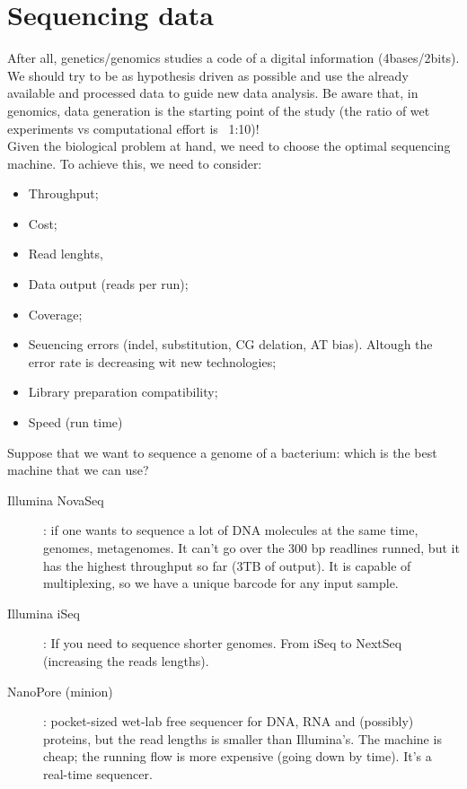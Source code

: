 \graphicspath{{chapters/images/04/}}
\chapter{Sequencing data}
After all, genetics/genomics studies a code of a digital information (4bases/2bits). We should try to be as hypothesis driven as possible and use the already available and processed data to guide new data analysis. Be aware that, in genomics, data generation is the starting point of the study (the ratio of wet experiments vs computational effort is ~1:10)!\\
Given the biological problem at hand, we need to choose the optimal sequencing machine. To achieve this, we need to consider:
\begin{itemize}
\item Throughput;
\item Cost;
\item Read lenghts, 
\item Data output (reads per run);
\item Coverage; 
\item Seuencing errors (indel, substitution, CG delation, AT bias). Altough the error rate is decreasing wit new technologies;
\item Library preparation compatibility;
\item Speed (run time)
\end{itemize}
Suppose that we want to sequence a genome of a bacterium: which is the best machine that we can use?

\begin{description}
\item[Illumina NovaSeq]: if one wants to sequence a lot of DNA molecules at the same time, genomes, metagenomes. It can’t go over the 300 bp readlines runned, but it has the highest throughput so far (3TB of output). It is capable of multiplexing, so we have a unique barcode for any input sample. 
\item[Illumina iSeq]: If you need to sequence shorter genomes. From iSeq to NextSeq (increasing the reads lengths). 
\item[NanoPore (minion)]: pocket-sized wet-lab free sequencer for DNA, RNA and (possibly) proteins, but the read lengths is smaller than Illumina's. The machine is cheap; the running flow is more expensive (going down by time). It's a real-time sequencer. 


\end{description}